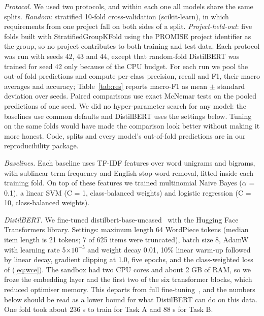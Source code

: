 \documentclass[conference,10pt,letterpaper]{IEEEtran}
\begin{document}
\emph{Protocol.} We used two protocols, and within each one all models share the same splits. \emph{Random}: stratified 10-fold cross-validation (scikit-learn), in which requirements from one project fall on both sides of a split. \emph{Project-held-out}: five folds built with StratifiedGroupKFold using the PROMISE project identifier as the group, so no project contributes to both training and test data. Each protocol was run with seeds 42, 43 and 44, except that random-fold DistilBERT was trained for seed 42 only because of the CPU budget. For each run we pool the out-of-fold predictions and compute per-class precision, recall and F1, their macro averages and accuracy; Table~\ref{tab:res} reports macro-F1 as mean $\pm$ standard deviation over seeds. Paired comparisons use exact McNemar tests on the pooled predictions of one seed. We did no hyper-parameter search for any model: the baselines use common defaults and DistilBERT uses the settings below. Tuning on the same folds would have made the comparison look better without making it more honest. Code, splits and every model's out-of-fold predictions are in our reproducibility package.

\emph{Baselines.} Each baseline uses TF-IDF features over word unigrams and bigrams, with sublinear term frequency and English stop-word removal, fitted inside each training fold. On top of these features we trained multinomial Naive Bayes ($\alpha$ = 0.1), a linear SVM (C = 1, class-balanced weights) and logistic regression (C = 10, class-balanced weights).

\emph{DistilBERT.} We fine-tuned distilbert-base-uncased~\cite{sanh2019distilbert} with the Hugging Face Transformers library. Settings: maximum length 64 WordPiece tokens (median item length is 21 tokens; 7 of 625 items were truncated), batch size 8, AdamW with learning rate 5$\times 10^{-5}$ and weight decay 0.01, 10\% linear warm-up followed by linear decay, gradient clipping at 1.0, five epochs, and the class-weighted loss of (\ref{eq:wce}). The sandbox had two CPU cores and about 2 GB of RAM, so we froze the embedding layer and the first two of the six transformer blocks, which reduced optimiser memory. This departs from full fine-tuning~\cite{devlin2019}, and the numbers below should be read as a lower bound for what DistilBERT can do on this data. One fold took about 236 s to train for Task A and 88 s for Task B.
\end{document}
